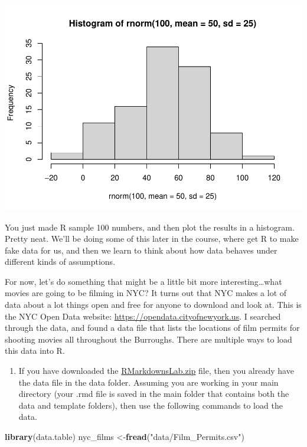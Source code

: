 \documentclass[
]{book}
\newenvironment{Shaded}{\begin{snugshade}}{\end{snugshade}}
\newcommand{\FunctionTok}[1]{\textcolor[rgb]{0.13,0.29,0.53}{\textbf{#1}}}
\newcommand{\NormalTok}[1]{#1}
\newcommand{\OtherTok}[1]{\textcolor[rgb]{0.56,0.35,0.01}{#1}}
\newcommand{\StringTok}[1]{\textcolor[rgb]{0.31,0.60,0.02}{#1}}
\providecommand{\tightlist}{%
  \setlength{\itemsep}{0pt}\setlength{\parskip}{0pt}}
\begin{document}
\includegraphics{Statistics_Lab_files/figure-latex/unnamed-chunk-34-1.pdf}

You just made R sample 100 numbers, and then plot the results in a histogram. Pretty neat. We'll be doing some of this later in the course, where get R to make fake data for us, and then we learn to think about how data behaves under different kinds of assumptions.

For now, let's do something that might be a little bit more interesting\ldots what movies are going to be filming in NYC? It turns out that NYC makes a lot of data about a lot things open and free for anyone to download and look at. This is the NYC Open Data website: \url{https://opendata.cityofnewyork.us}. I searched through the data, and found a data file that lists the locations of film permits for shooting movies all throughout the Burroughs. There are multiple ways to load this data into R.

\begin{enumerate}
\def\labelenumi{\arabic{enumi}.}
\tightlist
\item
  If you have downloaded the \href{https://github.com/CrumpLab/statisticsLab/raw/master/RMarkdownsLab.zip}{RMarkdownsLab.zip} file, then you already have the data file in the data folder. Assuming you are working in your main directory (your .rmd file is saved in the main folder that contains both the data and template folders), then use the following commands to load the data.
\end{enumerate}

\begin{Shaded}
\begin{Highlighting}[]
\FunctionTok{library}\NormalTok{(data.table)}
\NormalTok{nyc\_films }\OtherTok{\textless{}{-}}\FunctionTok{fread}\NormalTok{(}\StringTok{"data/Film\_Permits.csv"}\NormalTok{)}
\end{Highlighting}
\end{Shaded}
\end{document}
